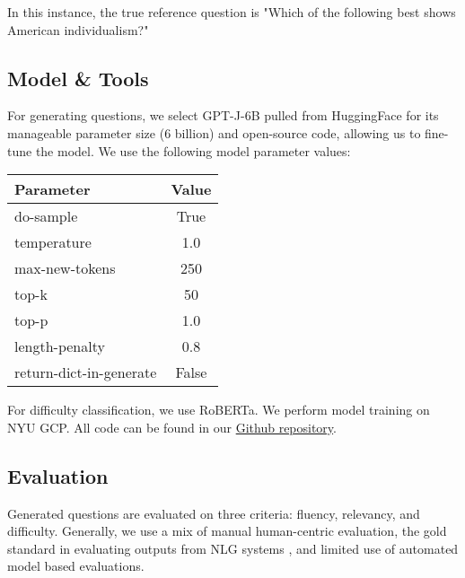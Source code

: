 \documentclass[11pt]{article}
\begin{document}
In this instance, the true reference question is "Which of the following best shows American individualism?"

\subsection{Model \& Tools}

For generating questions, we select GPT-J-6B \citep{gpt-j:4} pulled from HuggingFace for its manageable parameter size (6 billion) and open-source code, allowing us to fine-tune the model. We use the following model parameter values: 

\begin{table}[h]
\centering
\begin{tabular}{lc}
\hline
\textbf{Parameter} & \textbf{Value}\\
\hline
do-sample & True \\
temperature & 1.0 \\
max-new-tokens & 250 \\
top-k & 50 \\ 
top-p & 1.0  \\ 
length-penalty & 0.8 \\
return-dict-in-generate & False \\
\hline
\end{tabular}
\end{table}

For difficulty classification, we use RoBERTa.
We perform model training on NYU GCP. All code can be found in our \href{https://github.com/rbolline/Neural-Question-Generation-with-GPT-J}{Github repository}. 



\subsection{Evaluation}

Generated questions are evaluated on three criteria: fluency, relevancy, and difficulty. Generally, we use a mix of manual human-centric evaluation, the gold standard in evaluating outputs from NLG systems \citep{human-eval:7}, and limited use of automated model based evaluations.
\end{document}
